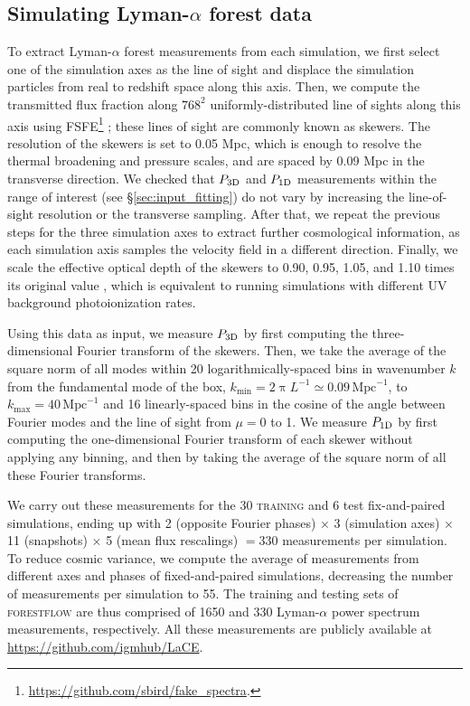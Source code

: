 \documentclass[longauth]{aa}
\newcommand{\lya}{Lyman-$\alpha$\xspace}
\newcommand{\lyaf}{Lyman-$\alpha$ forest\xspace}
\newcommand{\poned}{\ensuremath{P_{\rm 1D}}\xspace}
\newcommand{\pthreed}{\ensuremath{P_{\rm 3D}}\xspace}
\newcommand{\forestflow}{\textsc{forestflow}\xspace}
\newcommand{\lacehc}{\textsc{training}\xspace}
\newcommand{\iMpc}{\ensuremath{\,\mathrm{Mpc}^{-1}}}
\begin{document}

\subsection{Simulating \lyaf data}
\label{sec:input_extract_lya}

To extract \lyaf measurements from each simulation, we first select one of the simulation axes as the line of sight and displace the simulation particles from real to redshift space along this axis. Then, we compute the transmitted flux fraction along $768^2$ uniformly-distributed line of sights along this axis using \textsc{FSFE}\footnote{\url{https://github.com/sbird/fake_spectra}.} \citep{bird2017FSFEFakeSpectra}; these lines of sight are commonly known as skewers. The resolution of the skewers is set to 0.05 Mpc, which is enough to resolve the thermal broadening and pressure scales, and are spaced by 0.09 Mpc in the transverse direction. We checked that \pthreed and \poned measurements within the range of interest (see \S\ref{sec:input_fitting}) do not vary by increasing the line-of-sight resolution or the transverse sampling. After that, we repeat the previous steps for the three simulation axes to extract further cosmological information, as each simulation axis samples the velocity field in a different direction. Finally, we scale the effective optical depth of the skewers to 0.90, 0.95, 1.05, and 1.10 times its original value \citep[see][for more details about this approach]{hydro_Lukic2015}, which is equivalent to running simulations with different UV background photoionization rates.

Using this data as input, we measure \pthreed by first computing the three-dimensional Fourier transform of the skewers. Then, we take the average of the square norm of all modes within 20 logarithmically-spaced bins in wavenumber $k$ from the fundamental mode of the box, $k_\mathrm{min}=2\uppi L^{-1} \simeq 0.09\iMpc$, to $k_\mathrm{max}=40\iMpc$ and 16 linearly-spaced bins in the cosine of the angle between Fourier modes and the line of sight from $\mu=0$ to 1. We measure \poned by first computing the one-dimensional Fourier transform of each skewer without applying any binning, and then by taking the average of the square norm of all these Fourier transforms.

We carry out these measurements for the 30 \lacehc and 6 test fix-and-paired simulations, ending up with 2 (opposite Fourier phases) $\times$ 3 (simulation axes) $\times$ 11 (snapshots) $\times$ 5 (mean flux rescalings) $=330$ measurements per simulation. To reduce cosmic variance, we compute the average of measurements from different axes and phases of fixed-and-paired simulations, decreasing the number of measurements per simulation to 55. The training and testing sets of \forestflow are thus comprised of 1650 and 330 \lya power spectrum measurements, respectively. All these measurements are publicly available at \url{https://github.com/igmhub/LaCE}.
\end{document}
